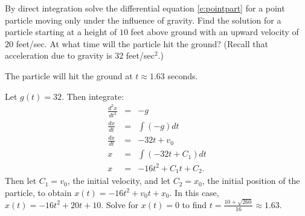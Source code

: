 \documentclass{ximera}
\begin{document}
\begin{exercise} \label{c6.7.1}
By direct integration solve the differential equation \eqref{e:pointpart}
for a point particle moving only under the influence of gravity.  Find the
solution for a particle starting at a height of $10$ feet above ground with
an upward velocity of $20$ feet/sec.  At what time will the particle hit
the ground?  (Recall that acceleration due to gravity is $32$ feet/sec$^2$.)

\begin{solution}

\ans The particle will hit the ground at $t \approx 1.63$ seconds.

\soln Let $g(t) = 32$.  Then integrate:
\[
\begin{array}{rcl}
\frac{d^2x}{dt^2} & = & -g \\
\frac{dx}{dt} & = & \int (-g)dt \\
\frac{dx}{dt} & = & -32t + v_0 \\
x & = & \int (-32t + C_1)dt \\
x & = & -16t^2 + C_1t + C_2.
\end{array}
\]
Then let $C_1 = v_0$, the initial velocity, and let $C_2 = x_0$, the initial
position of the particle, to obtain $x(t) = -16t^2 + v_0t + x_0$.  In this
case, $x(t) = -16t^2 + 20t + 10$.  Solve for $x(t) = 0$ to find
$t = \frac{10 + \sqrt{260}}{16} \approx 1.63$.

\end{solution}
\end{exercise}
\end{document}
